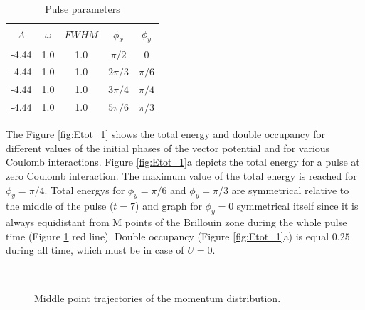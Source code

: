 \begin{table}[h!]
\begin{center}
  \begin{tabular}{ | c | c | c | c | c |}
    \hline
    $A$ & $\omega$ & $FWHM$ & $\phi_x$ & $\phi_y$ \\ \hline
    -4.44 & 1.0 & 1.0 & $\pi /2$ & 0  \\ \hline
    -4.44 & 1.0 & 1.0 & $2\pi /3$ & $\pi /6$   \\ \hline
    -4.44 & 1.0 & 1.0 & $3\pi /4$ & $\pi /4$   \\ \hline
    -4.44 & 1.0 & 1.0 & $5\pi /6$ & $\pi /3$   \\    
    \hline
  \end{tabular}
\caption{Pulse parameters}
\label{table:1}
\end{center}
\end{table}

The Figure \ref{fig:Etot_1} shows the total energy and double occupancy for different values of the initial phases of the vector potential and for various Coulomb interactions. Figure \ref{fig:Etot_1}a depicts the total energy for a pulse at zero Coulomb interaction. The maximum value of the total energy is reached for $\phi_y=\pi /4$. Total energys for $\phi_y=\pi /6$ and $\phi_y=\pi /3$ are symmetrical relative to the middle of the  pulse ($t=7$) and graph for $\phi_y=0$ symmetrical itself since it is always equidistant from M points of the Brillouin zone during the whole pulse time (Figure \ref{fig:Pulse_p_1} red line). Double occupancy (Figure \ref{fig:Etot_1}a) is equal $0.25$ during all time, which must be in case of $U=0$.



\begin{figure}[h!]
 \\
\caption{Middle point trajectories of the momentum distribution.}
\label{fig:Pulse_p_1}
\end{figure}


